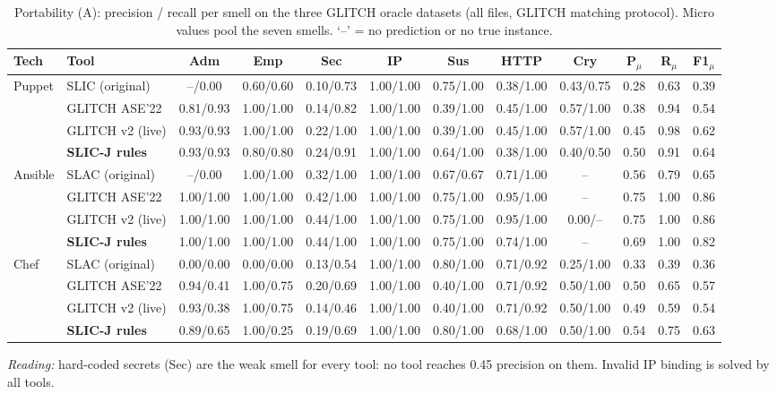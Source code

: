 \begin{table}[t]\centering\caption{Portability (A): precision / recall per smell on the three GLITCH oracle datasets (all files, GLITCH matching protocol). Micro values pool the seven smells. `--' = no prediction or no true instance.}\label{tab:rq1}
\scriptsize\setlength{\tabcolsep}{3pt}\begin{tabular}{llcccccccccc}\toprule
Tech & Tool & Adm & Emp & Sec & IP & Sus & HTTP & Cry & P$_\mu$ & R$_\mu$ & F1$_\mu$ \\ \midrule
Puppet & SLIC (original) & --/0.00 & 0.60/0.60 & 0.10/0.73 & 1.00/1.00 & 0.75/1.00 & 0.38/1.00 & 0.43/0.75 & 0.28 & 0.63 & 0.39 \\
 & GLITCH ASE'22 & 0.81/0.93 & 1.00/1.00 & 0.14/0.82 & 1.00/1.00 & 0.39/1.00 & 0.45/1.00 & 0.57/1.00 & 0.38 & 0.94 & 0.54 \\
 & GLITCH v2 (live) & 0.93/0.93 & 1.00/1.00 & 0.22/1.00 & 1.00/1.00 & 0.39/1.00 & 0.45/1.00 & 0.57/1.00 & 0.45 & 0.98 & 0.62 \\
 & \textbf{SLIC-J rules} & 0.93/0.93 & 0.80/0.80 & 0.24/0.91 & 1.00/1.00 & 0.64/1.00 & 0.38/1.00 & 0.40/0.50 & 0.50 & 0.91 & 0.64 \\
\midrule
Ansible & SLAC (original) & --/0.00 & 1.00/1.00 & 0.32/1.00 & 1.00/1.00 & 0.67/0.67 & 0.71/1.00 & -- & 0.56 & 0.79 & 0.65 \\
 & GLITCH ASE'22 & 1.00/1.00 & 1.00/1.00 & 0.42/1.00 & 1.00/1.00 & 0.75/1.00 & 0.95/1.00 & -- & 0.75 & 1.00 & 0.86 \\
 & GLITCH v2 (live) & 1.00/1.00 & 1.00/1.00 & 0.44/1.00 & 1.00/1.00 & 0.75/1.00 & 0.95/1.00 & 0.00/-- & 0.75 & 1.00 & 0.86 \\
 & \textbf{SLIC-J rules} & 1.00/1.00 & 1.00/1.00 & 0.44/1.00 & 1.00/1.00 & 0.75/1.00 & 0.74/1.00 & -- & 0.69 & 1.00 & 0.82 \\
\midrule
Chef & SLAC (original) & 0.00/0.00 & 0.00/0.00 & 0.13/0.54 & 1.00/1.00 & 0.80/1.00 & 0.71/0.92 & 0.25/1.00 & 0.33 & 0.39 & 0.36 \\
 & GLITCH ASE'22 & 0.94/0.41 & 1.00/0.75 & 0.20/0.69 & 1.00/1.00 & 0.40/1.00 & 0.71/0.92 & 0.50/1.00 & 0.50 & 0.65 & 0.57 \\
 & GLITCH v2 (live) & 0.93/0.38 & 1.00/0.75 & 0.14/0.46 & 1.00/1.00 & 0.40/1.00 & 0.71/0.92 & 0.50/1.00 & 0.49 & 0.59 & 0.54 \\
 & \textbf{SLIC-J rules} & 0.89/0.65 & 1.00/0.25 & 0.19/0.69 & 1.00/1.00 & 0.80/1.00 & 0.68/1.00 & 0.50/1.00 & 0.54 & 0.75 & 0.63 \\
\bottomrule\end{tabular}
\par\vspace{3pt}\parbox{\textwidth}{\footnotesize\emph{Reading:} hard-coded secrets (Sec) are the weak smell for every tool: no tool reaches 0.45 precision on them. Invalid IP binding is solved by all tools.}
\end{table}
